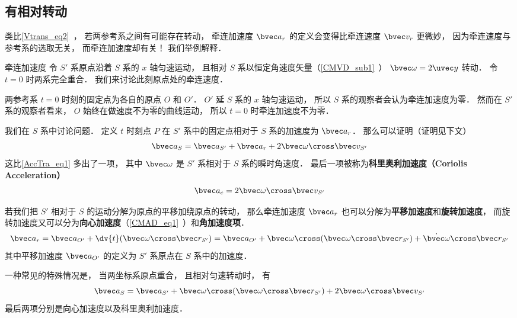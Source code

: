 \subsection{有相对转动}
类比\autoref{Vtrans_eq2}~， 若两参考系之间有可能存在转动， 牵连加速度 $\bvec a_{r}$ 的定义会变得比牵连速度 $\bvec v_r$ 更微妙， 因为牵连速度与参考系的选取无关， 而牵连加速度却有关！ 我们举例解释．

\begin{example}{牵连加速度}
令 $S'$ 系原点沿着 $S$ 系的 $x$ 轴匀速运动， 且相对 $S$ 系以恒定角速度矢量（\autoref{CMVD_sub1}~） $\bvec \omega = 2\uvec y$ 转动． 令 $t = 0$ 时两系完全重合． 我们来讨论此刻原点处的牵连速度．

两参考系 $t = 0$ 时刻的固定点为各自的原点 $O$ 和 $O'$． $O'$ 延 $S$ 系的 $x$ 轴匀速运动， 所以 $S$ 系的观察者会认为牵连加速度为零． 然而在 $S'$ 系的观察者看来， $O$ 始终在做速度不为零的曲线运动， 所以 $t = 0$ 时牵连加速度不为零．
\end{example}

我们在 $S$ 系中讨论问题． 定义 $t$ 时刻点 $P$ 在 $S'$ 系中的固定点相对于 $S$ 系的加速度为 $\bvec a_{r}$． 那么可以证明（证明见下文）
\begin{equation}\label{AccTra_eq2}
\bvec a_S = \bvec a_{S'} + \bvec a_{r} + 2 \bvec \omega \cross \bvec v_{S'}
\end{equation}
这比\autoref{AccTra_eq1} 多出了一项， 其中 $\bvec \omega$ 是 $S'$ 系相对于 $S$ 系的瞬时角速度． 最后一项被称为\textbf{科里奥利加速度（Coriolis Acceleration）}
\begin{equation}\label{AccTra_eq4}
\bvec a_c = 2 \bvec \omega \cross \bvec v_{S'}
\end{equation}

若我们把 $S'$ 相对于 $S$ 的运动分解为原点的平移加绕原点的转动， 那么牵连加速度 $\bvec a_r$ 也可以分解为\textbf{平移加速度}和\textbf{旋转加速度}， 而旋转加速度又可以分为\textbf{向心加速度}（\autoref{CMAD_eq1}~）和\textbf{角加速度项}．
\begin{equation}\label{AccTra_eq5}
\bvec a_{r} = \bvec a_{O'} + \dv{t}(\bvec\omega\cross\bvec r_{S'})
= \bvec a_{O'} + \bvec\omega\cross(\bvec\omega\cross\bvec r_{S'}) + \dot{\bvec\omega} \cross\bvec r_{S'}
\end{equation}
其中平移加速度 $\bvec a_{O'}$ 的定义为 $S'$ 系原点在 $S$ 系中的加速度．

一种常见的特殊情况是， 当两坐标系原点重合， 且相对匀速转动时， 有
\begin{equation}
\bvec a_S = \bvec a_{S'} + \bvec\omega\cross(\bvec\omega\cross\bvec r_{S'}) + 2 \bvec \omega \cross \bvec v_{S'}
\end{equation}
最后两项分别是向心加速度以及科里奥利加速度．

